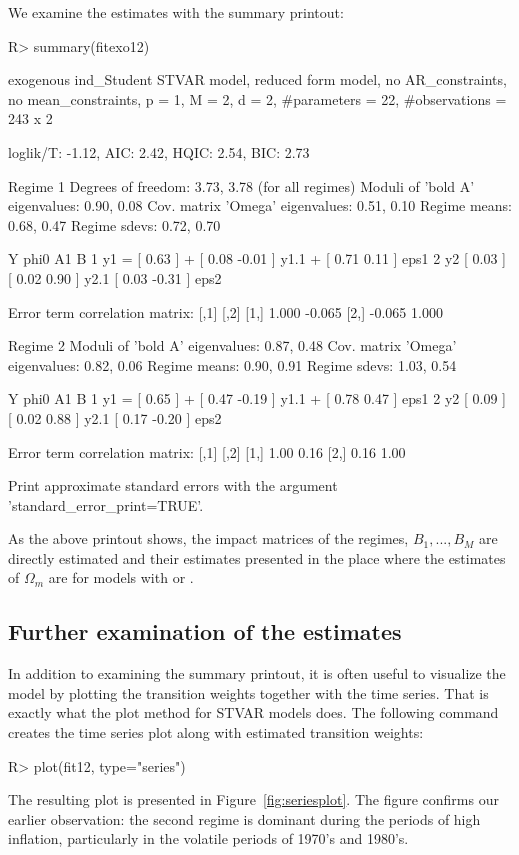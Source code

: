 \documentclass[nojss]{jss}
\begin{document}
We examine the estimates with the summary printout:
\begin{CodeChunk}
\begin{CodeInput}
R> summary(fitexo12)
\end{CodeInput}
\begin{CodeOutput}
exogenous ind_Student STVAR model, reduced form model, no AR_constraints,
no mean_constraints,
  p = 1, M = 2, d = 2, #parameters = 22, #observations = 243 x 2

loglik/T: -1.12, AIC: 2.42, HQIC: 2.54, BIC: 2.73

Regime 1
Degrees of freedom: 3.73, 3.78 (for all regimes)
Moduli of 'bold A' eigenvalues:  0.90, 0.08
Cov. matrix 'Omega' eigenvalues: 0.51, 0.10
Regime means: 0.68, 0.47
Regime sdevs: 0.72, 0.70

   Y     phi0          A1                      B
1 y1 = [ 0.63 ] + [  0.08 -0.01 ] y1.1 + [  0.71  0.11 ] eps1
2 y2   [ 0.03 ]   [  0.02  0.90 ] y2.1   [  0.03 -0.31 ] eps2

Error term correlation matrix:
       [,1]   [,2]
[1,]  1.000 -0.065
[2,] -0.065  1.000

Regime 2
Moduli of 'bold A' eigenvalues:  0.87, 0.48
Cov. matrix 'Omega' eigenvalues: 0.82, 0.06
Regime means: 0.90, 0.91
Regime sdevs: 1.03, 0.54

   Y     phi0          A1                      B
1 y1 = [ 0.65 ] + [  0.47 -0.19 ] y1.1 + [  0.78  0.47 ] eps1
2 y2   [ 0.09 ]   [  0.02  0.88 ] y2.1   [  0.17 -0.20 ] eps2

Error term correlation matrix:
     [,1] [,2]
[1,] 1.00 0.16
[2,] 0.16 1.00

Print approximate standard errors with the argument 'standard_error_print=TRUE'.
\end{CodeOutput}
\end{CodeChunk}
As the above printout shows, the impact matrices of the regimes, $B_1,...,B_M$ are directly estimated and their estimates presented in the place where the estimates of $\Omega_m$ are for models with  or .

\subsection{Further examination of the estimates}\label{sec:examestim}
In addition to examining the summary printout, it is often useful to visualize the model by plotting the transition weights together with the time series. That is exactly what the plot method for STVAR models does. The following command creates the time series plot along with estimated transition weights:
%
\begin{CodeChunk}
\begin{CodeInput}
R> plot(fit12, type="series")
\end{CodeInput}
\end{CodeChunk}
%
The resulting plot is presented in Figure~\ref{fig:seriesplot}. The figure confirms our earlier observation: the second regime is dominant during the periods of high inflation, particularly in the volatile periods of 1970's and 1980's.
\end{document}
